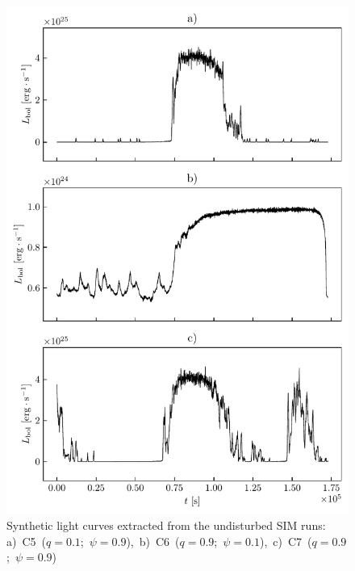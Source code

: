     \begin{figure}
    \begin{center}
        \includegraphics[width=1.0\textwidth]{img/plot_light_curves_disturbed.pdf}
    \end{center}
    \caption{Synthetic light curves extracted from the undisturbed SIM runs: \mbox{a) C5 ($q = 0.1$; $\psi = 0.9$), b) C6 ($q = 0.9$; $\psi = 0.1$), c) C7 ($q = 0.9$; $\psi = 0.9$)}}
    \label{fig:plot_light_curves_disturbed}
    \end{figure}

